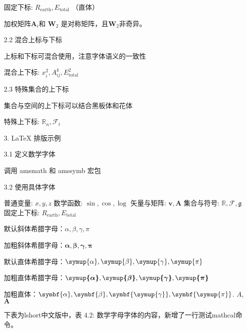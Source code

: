 \documentclass{article}
\begin{document}
固定下标: $R_\mathrm{earth}, E_\text{total}$ （直体）

加权矩阵$\symbf{A}_{i}$和 ${{\boldsymbol{W}}_{2}}$ 是对称矩阵，且$ {{\boldsymbol{W}}_{2}}$非奇异。	\label{assum_dca1}

2.2 混合上标与下标

上标和下标可混合使用，注意字体语义的一致性

混合上下标: $x_i^2, A_{ij}^k, E_\mathrm{total}^2$

2.3 特殊集合的上下标

集合与空间的上下标可以结合黑板体和花体

特殊上下标: $\mathbb{R}_n, \mathcal{F}_t$


3. LaTeX 排版示例

3.1 定义数学字体

调用 amsmath 和 amssymb 宏包

3.2 使用具体字体

普通变量: $x, y, z$
数学函数: $\sin, \cos, \log$
矢量与矩阵: $\boldsymbol{v}, \boldsymbol{A}$
集合与符号: $\mathbb{R}, \mathcal{F}, \mathfrak{g}$
固定上下标: $R_\mathrm{earth}, E_\text{total}$





默认斜体希腊字母：$\alpha, \beta, \gamma, \pi$

加粗斜体希腊字母：$\boldsymbol{\alpha}, \boldsymbol{\beta}, \boldsymbol{\gamma}, \boldsymbol{\pi}$

默认直体希腊字母：$\symup{\alpha}, \symup{\beta}, \symup{\gamma}, \symup{\pi}$

加粗直体希腊字母：$\boldsymbol{\symup{\alpha}}, \boldsymbol{\symup{\beta}}, \boldsymbol{\symup{\gamma}}, \boldsymbol{\symup{\pi}}$

加粗直体：$\symbf{{\alpha}}, \symbf{{\beta}}, \symbf{\symup{\gamma}}, \symbf{\symup{\pi}}$. $A$,$\symbf{A}$


下表为lshort中文版中，表 4.2: 数学字母字体的内容，新增了一行测试mathcal命令。
\end{document}
